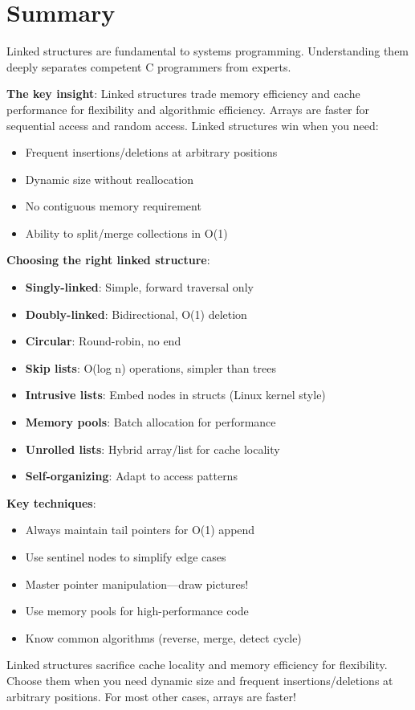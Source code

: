 \section{Summary}

Linked structures are fundamental to systems programming. Understanding them deeply separates competent C programmers from experts.

\textbf{The key insight}: Linked structures trade memory efficiency and cache performance for flexibility and algorithmic efficiency. Arrays are faster for sequential access and random access. Linked structures win when you need:
\begin{itemize}
    \item Frequent insertions/deletions at arbitrary positions
    \item Dynamic size without reallocation
    \item No contiguous memory requirement
    \item Ability to split/merge collections in O(1)
\end{itemize}

\textbf{Choosing the right linked structure}:

\begin{itemize}
    \item \textbf{Singly-linked}: Simple, forward traversal only
    \item \textbf{Doubly-linked}: Bidirectional, O(1) deletion
    \item \textbf{Circular}: Round-robin, no end
    \item \textbf{Skip lists}: O(log n) operations, simpler than trees
    \item \textbf{Intrusive lists}: Embed nodes in structs (Linux kernel style)
    \item \textbf{Memory pools}: Batch allocation for performance
    \item \textbf{Unrolled lists}: Hybrid array/list for cache locality
    \item \textbf{Self-organizing}: Adapt to access patterns
\end{itemize}

\textbf{Key techniques}:

\begin{itemize}
    \item Always maintain tail pointers for O(1) append
    \item Use sentinel nodes to simplify edge cases
    \item Master pointer manipulation—draw pictures!
    \item Use memory pools for high-performance code
    \item Know common algorithms (reverse, merge, detect cycle)
\end{itemize}

Linked structures sacrifice cache locality and memory efficiency for flexibility. Choose them when you need dynamic size and frequent insertions/deletions at arbitrary positions. For most other cases, arrays are faster!
